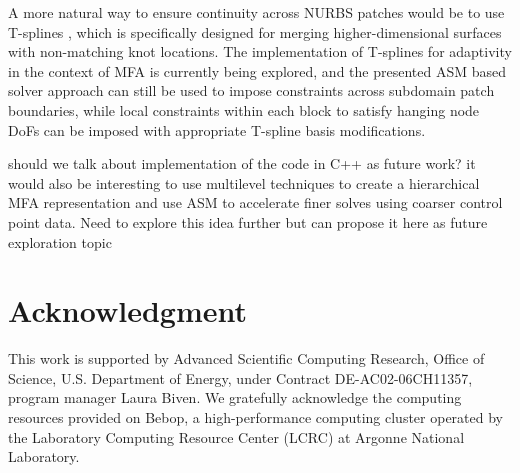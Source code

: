 \documentclass[conference]{IEEEtran}
\begin{document}
A more natural way to ensure continuity across NURBS patches would be to use T-splines \cite{sederberg-2004}, which is specifically designed for merging higher-dimensional surfaces with non-matching knot locations. The implementation of T-splines for adaptivity in the context of MFA is currently being explored, and the presented ASM based solver approach can still be used to impose constraints across subdomain patch boundaries, while local constraints within each block to satisfy hanging node DoFs can be imposed with appropriate T-spline basis modifications.

{\color{red} 
	should we talk about implementation of the code in C++ as future work?
	it would also be interesting to use multilevel techniques to create a hierarchical MFA representation and use ASM to accelerate finer solves using coarser control point data. Need to explore this idea further but can propose it here as future exploration topic
}


\section*{Acknowledgment}

This work is supported by Advanced Scientific Computing Research, Office of Science, U.S. Department of Energy, under
Contract DE-AC02-06CH11357, program manager Laura Biven. We gratefully acknowledge the computing resources provided on
Bebop, a high-performance computing cluster operated by the Laboratory Computing Resource Center (LCRC) at Argonne
National Laboratory.




\end{document}
